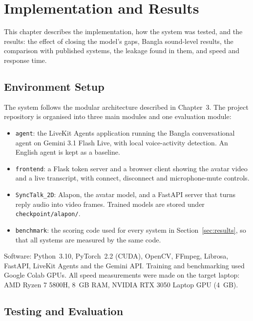\chapter{Implementation and Results}

This chapter describes the implementation, how the system was tested, and the results: the effect of closing the model's gaps, Bangla sound-level results, the comparison with published systems, the leakage found in them, and speed and response time.

\section{Environment Setup}

The system follows the modular architecture described in Chapter~3. The project repository is organised into three main modules and one evaluation module:

\begin{itemize}
    \item \texttt{agent}: the LiveKit Agents application running the Bangla conversational agent on Gemini 3.1 Flash Live, with local voice-activity detection. An English agent is kept as a baseline.
    \item \texttt{frontend}: a Flask token server and a browser client showing the avatar video and a live transcript, with connect, disconnect and microphone-mute controls.
    \item \texttt{SyncTalk\_2D}: Alapon, the avatar model, and a FastAPI server that turns reply audio into video frames. Trained models are stored under \texttt{checkpoint/alapon/}.
    \item \texttt{benchmark}: the scoring code used for every system in Section~\ref{sec:results}, so that all systems are measured by the same code.
\end{itemize}

\noindent
Software: Python~3.10, PyTorch~2.2 (CUDA), OpenCV, FFmpeg, Librosa, FastAPI, LiveKit Agents and the Gemini API. Training and benchmarking used Google Colab GPUs. All speed measurements were made on the target laptop: AMD Ryzen 7 5800H, 8~GB RAM, NVIDIA RTX 3050 Laptop GPU (4~GB).

\section{Testing and Evaluation}
\label{sec:testing}

